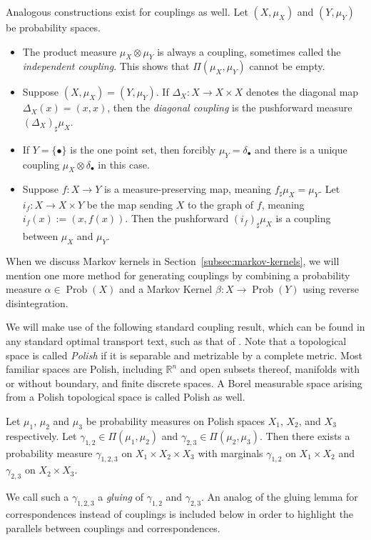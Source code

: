 \documentclass[twoside,11pt]{article}
\DeclareMathOperator{\prob}{Prob}
\begin{document}
Analogous constructions exist for couplings as well. Let $(X,\mu_X)$ and $(Y,\mu_Y)$ be probability spaces.
\begin{itemize}
    \item The product measure $\mu_X\otimes \mu_Y$ is always a coupling, sometimes called the \emph{independent coupling}. This shows that $\Pi(\mu_X,\mu_Y)$ cannot be empty.
    \item Suppose $(X,\mu_X) = (Y,\mu_Y)$. If $\Delta_X:X\to X\times X$ denotes the diagonal map $\Delta_X(x) = (x,x)$, then the \emph{diagonal coupling} is the pushforward measure $(\Delta_X)_\sharp \mu_X$.
    
    \item If $Y=\{\bullet\}$ is the one point set, then forcibly $\mu_Y = \delta_\bullet$ and there is a unique coupling $\mu_X\otimes \delta_\bullet$ in this case.
    
    \item Suppose $f:X\to Y$ is a measure-preserving map, meaning $f_\sharp \mu_X = \mu_Y$. Let $i_f:X\to X\times Y$ be the map sending $X$ to the graph of $f$, meaning $i_f(x) := (x,f(x))$. Then the pushforward $(i_f)_\sharp \mu_X$ is a coupling between $\mu_X$ and $\mu_Y$.
\end{itemize}


When we discuss Markov kernels in Section~\ref{subsec:markov-kernels}, we will mention one more method for generating couplings by combining a probability measure $\alpha \in \prob(X)$ and a Markov Kernel $\beta:X\to\prob(Y)$ using reverse disintegration.

We will make use of the following standard coupling result, which can be found in any standard optimal transport text, such as that of \citet[Lemma 7.6]{villani_topics_2003}. Note that a topological space is called \emph{Polish} if it is separable and metrizable by a complete metric. Most familiar spaces are Polish, including $\mathbb R^n$ and open subsets thereof, manifolds with or without boundary, and finite discrete spaces. A Borel measurable space arising from a Polish topological space is called Polish as well.
\begin{proposition}\label{lem:gluing}
    Let $\mu_1$, $\mu_2$ and $\mu_3$ be probability measures on Polish spaces $X_1$, $X_2$, and $X_3$ respectively. Let $\gamma_{1,2} \in \Pi(\mu_1, \mu_2)$ and $\gamma_{2,3} \in \Pi(\mu_2, \mu_3)$. Then there exists a probability measure $\gamma_{1,2,3}$ on $X_1\times X_2 \times X_3$ with marginals $\gamma_{1,2}$ on $X_1\times X_2$ and $\gamma_{2,3}$ on $X_2\times X_3$.
\end{proposition}
We call such a $\gamma_{1,2,3}$ a \emph{gluing} of $\gamma_{1,2}$ and $\gamma_{2,3}$.
An analog of the  gluing lemma for correspondences \citep[see][Exercise 7.3.26]{BBI} instead of couplings is included below in order to highlight the parallels between couplings and correspondences.
\end{document}

